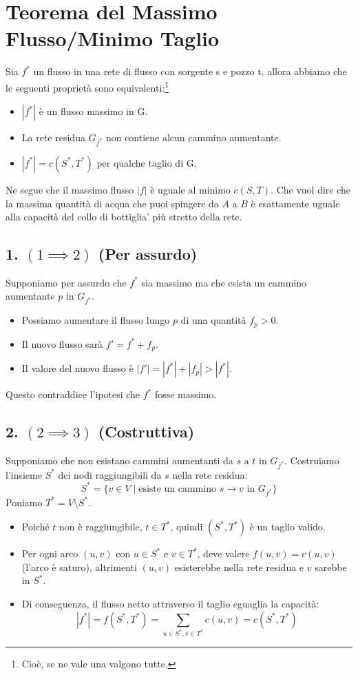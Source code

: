 \section{Teorema del Massimo Flusso/Minimo Taglio}
Sia $f^*$ un flusso in una rete di flusso con sorgente s e pozzo t, allora abbiamo che le seguenti proprietà sono equivalenti:\footnote{Cioè, se ne vale una valgono tutte.}
\begin{itemize}
    \item $|f^*|$ è un flusso massimo in G.
    \item La rete residua $G_{f^*}$ non contiene alcun cammino aumentante.
    \item $|f^*| = c(S^*, T^*)$ per qualche taglio di G.
\end{itemize}
Ne segue che il massimo flusso $|f|$ è uguale al minimo $c(S,T)$. Che vuol dire che la massima quantità di acqua che puoi spingere da $A$ a $B$ è esattamente uguale alla capacità del collo di bottiglia' più stretto della rete.

\subsection*{1. $(1 \implies 2)$ (Per assurdo)}
Supponiamo per assurdo che $f^*$ sia massimo ma che esista un cammino aumentante $p$ in $G_{f^*}$.
\begin{itemize}
    \item Possiamo aumentare il flusso lungo $p$ di una quantità $f_p > 0$.
    \item Il nuovo flusso sarà $f' = f^* + f_p$.
    \item Il valore del nuovo flusso è $|f'| = |f^*| + |f_p| > |f^*|$.
\end{itemize}
Questo contraddice l'ipotesi che $f^*$ fosse massimo.

\subsection*{2. $(2 \implies 3)$ (Costruttiva)}
Supponiamo che non esistano cammini aumentanti da $s$ a $t$ in $G_{f^*}$.
Costruiamo l'insieme $S^*$ dei nodi raggiungibili da $s$ nella rete residua:
\[ S^* = \{ v \in V \mid \text{esiste un cammino } s \to v \text{ in } G_{f^*} \} \]
Poniamo $T^* = V \setminus S^*$.
\begin{itemize}
    \item Poiché $t$ non è raggiungibile, $t \in T^*$, quindi $(S^*, T^*)$ è un taglio valido.
    \item Per ogni arco $(u, v)$ con $u \in S^*$ e $v \in T^*$, deve valere $f(u, v) = c(u, v)$ (l'arco è saturo), altrimenti $(u, v)$ esisterebbe nella rete residua e $v$ sarebbe in $S^*$.
    \item Di conseguenza, il flusso netto attraverso il taglio eguaglia la capacità:
    \[ |f^*| = f(S^*, T^*) = \sum_{u \in S^*, v \in T^*} c(u, v) = c(S^*, T^*) \]
\end{itemize}

